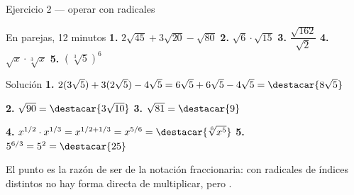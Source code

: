 \documentclass[aspectratio=169,10pt]{beamer}
\begin{document}
\begin{frame}{Ejercicio 2 — operar con radicales}
  \scriptsize
  \begin{alertblock}{En parejas, 12 minutos}
    \tiny
    \textbf{1.} $2\sqrt{45}+3\sqrt{20}-\sqrt{80}$ \qquad
    \textbf{2.} $\sqrt{6}\cdot\sqrt{15}$ \qquad
    \textbf{3.} $\dfrac{\sqrt{162}}{\sqrt{2}}$ \qquad
    \textbf{4.} $\sqrt{x}\cdot\sqrt[3]{x}$ \qquad
    \textbf{5.} $\left(\sqrt[3]{5}\right)^{6}$
  \end{alertblock}

  \vspace{0.05cm}
  \begin{block}{Solución}
    \tiny
    \textbf{1.} $2(3\sqrt5)+3(2\sqrt5)-4\sqrt5
    = 6\sqrt5+6\sqrt5-4\sqrt5 = \destacar{8\sqrt{5}}$

    \vspace{0.08cm}
    \textbf{2.} $\sqrt{90} = \destacar{3\sqrt{10}}$ \qquad
    \textbf{3.} $\sqrt{81} = \destacar{9}$

    \vspace{0.08cm}
    \textbf{4.} $x^{1/2}\cdot x^{1/3} = x^{1/2+1/3}
    = x^{5/6} = \destacar{\sqrt[6]{x^{5}}}$ \qquad
    \textbf{5.} $5^{6/3} = 5^{2} = \destacar{25}$
  \end{block}

  \vspace{0.05cm}
  {\tiny\color{uniGris} El punto  es la razón de ser de la
  notación fraccionaria: con radicales de índices distintos no hay forma
  directa de multiplicar, pero .}
\end{frame}
\end{document}
